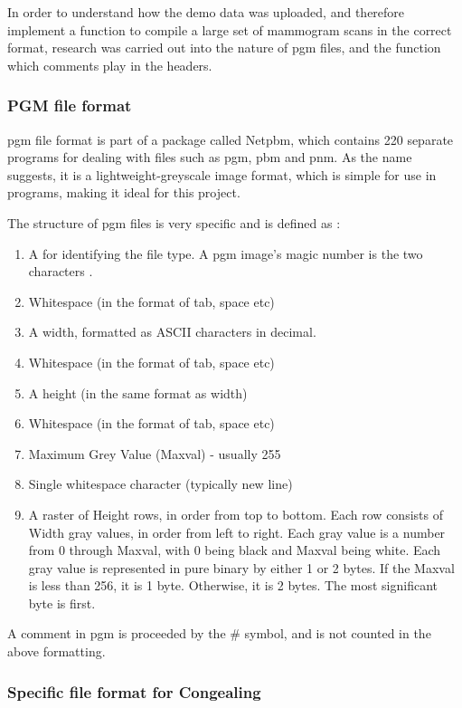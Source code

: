 In order to understand how the demo data was uploaded, and therefore implement a function to compile a large set of mammogram scans in the correct format, research was carried out into the nature of \acrshort{pgm} files, and the function which comments play in the headers.

\subsubsection{PGM file format}

\acrfull{pgm} file format is part of a package called Netpbm, which contains 220 separate programs for dealing with files such as \acrshort{pgm}, pbm and pnm. As the name suggests, it is a lightweight-greyscale image format, which is simple for use in programs, making it ideal for this project.

The structure of \acrshort{pgm} files is very specific and is defined as \cite{PGM_Format}:

\begin{enumerate}
  \item A  for identifying the file type. A pgm image's magic number is the two characters .
  \item Whitespace (in the format of tab, space etc)
  \item A width, formatted as ASCII characters in decimal.
  \item Whitespace (in the format of tab, space etc)
  \item A height (in the same format as width)
  \item Whitespace (in the format of tab, space etc)
  \item Maximum Grey Value (Maxval) - usually 255
  \item Single whitespace character (typically new line)
  \item A raster of Height rows, in order from top to bottom. Each row consists of Width gray values, in order from left to right. Each gray value is a number from 0 through Maxval, with 0 being black and Maxval being white. Each gray value is represented in pure binary by either 1 or 2 bytes. If the Maxval is less than 256, it is 1 byte. Otherwise, it is 2 bytes. The most significant byte is first.
\end{enumerate}

A comment in \acrshort{pgm} is proceeded by the \# symbol, and is not counted in the above formatting.

\subsubsection{Specific file format for Congealing}
\label{sssec:load}

